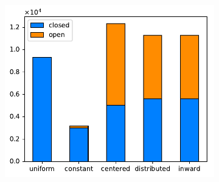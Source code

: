 \begin{figure}
\begin{subfigure}{\figwidth}
\label{printtime}
\end{subfigure}
\begin{subfigure}{\figwidth}\centering
\includegraphics[height=\figheight]{sources-validation-path-counts.pdf}
\caption{}
\label{pathcounts}
\end{subfigure}


\end{figure}
